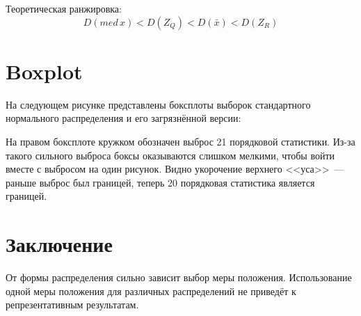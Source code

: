 \documentclass{article} %
\begin{document}
Теоретическая ранжировка:
\[ D(med \, x) < D(Z_Q) < D(\bar{x}) < D(Z_R) \]

\pagebreak
\section{Boxplot}
На следующем рисунке представлены боксплоты выборок стандартного нормального распределения и его загрязнённой версии:



На правом боксплоте кружком обозначен выброс 21 порядковой статистики. Из-за такого сильного выброса боксы оказываются слишком мелкими, чтобы войти вместе с выбросом на один рисунок. Видно укорочение верхнего <<уса>>~--- раньше выброс был границей, теперь 20 порядковая статистика является границей.

\section{Заключение}
От формы распределения сильно зависит выбор меры положения. Использование одной меры положения для различных распределений не приведёт к репрезентативным результатам.
\end{document}
